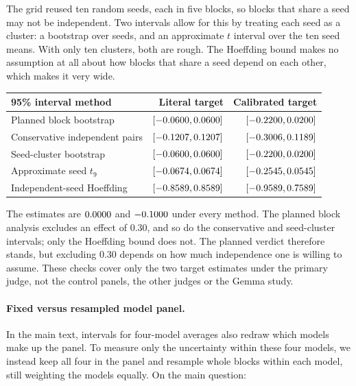 The grid reused ten random seeds, each in five blocks, so blocks that share a
seed may not be independent. Two intervals allow for this by treating each
seed as a cluster: a bootstrap over seeds, and an approximate $t$ interval
over the ten seed means. With only ten clusters, both are rough. The
Hoeffding bound makes no assumption at all about how blocks that share a seed
depend on each other, which makes it very wide.

\begin{center}\small
\begin{tabular}{@{}lrr@{}}
\toprule
95\% interval method & Literal target & Calibrated target\\
\midrule
Planned block bootstrap & $[-0.0600, 0.0600]$ & $[-0.2200, 0.0200]$\\
Conservative independent pairs & $[-0.1207, 0.1207]$ & $[-0.3006, 0.1189]$\\
Seed-cluster bootstrap & $[-0.0600, 0.0600]$ & $[-0.2200, 0.0200]$\\
Approximate seed $t_9$ & $[-0.0674, 0.0674]$ & $[-0.2545, 0.0545]$\\
Independent-seed Hoeffding & $[-0.8589, 0.8589]$ & $[-0.9589, 0.7589]$\\
\bottomrule
\end{tabular}
\end{center}

The estimates are $0.0000$ and $-0.1000$ under
every method. The planned block analysis excludes an effect of 0.30, and so
do the conservative and seed-cluster intervals; only the Hoeffding bound does
not. The planned verdict therefore stands, but excluding 0.30 depends on how
much independence one is willing to assume. These checks cover only the two
target estimates under the primary judge, not the control panels, the other
judges or the Gemma study.

\paragraph{Fixed versus resampled model panel.}
In the main text, intervals for four-model averages also redraw which models
make up the panel. To measure only the uncertainty within these four models,
we instead keep all four in the panel and resample whole blocks within each
model, still weighting the models equally. On the main question:

